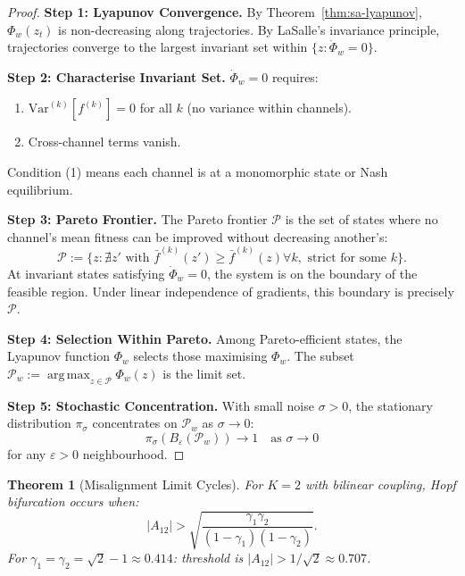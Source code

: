 \documentclass[12pt]{article}
\newtheorem{theorem}{Theorem}[section]
\newcommand{\Var}{\mathrm{Var}}
\DeclareMathOperator*{\argmax}{arg\,max}
\begin{document}
\begin{proof}
\textbf{Step 1: Lyapunov Convergence.}
By Theorem~\ref{thm:sa-lyapunov}, $\Phi_w(z_t)$ is non-decreasing along trajectories. By LaSalle's invariance principle, trajectories converge to the largest invariant set within $\{z : \dot{\Phi}_w = 0\}$.

\textbf{Step 2: Characterise Invariant Set.}
$\dot{\Phi}_w = 0$ requires:
\begin{enumerate}
    \item $\Var^{(k)}[f^{(k)}] = 0$ for all $k$ (no variance within channels).
    \item Cross-channel terms vanish.
\end{enumerate}
Condition (1) means each channel is at a monomorphic state or Nash equilibrium.

\textbf{Step 3: Pareto Frontier.}
The Pareto frontier $\mathcal{P}$ is the set of states where no channel's mean fitness can be improved without decreasing another's:
\[
\mathcal{P} := \{z : \nexists z' \text{ with } \bar{f}^{(k)}(z') \geq \bar{f}^{(k)}(z) \forall k, \text{ strict for some } k\}.
\]
At invariant states satisfying $\dot{\Phi}_w = 0$, the system is on the boundary of the feasible region. Under linear independence of gradients, this boundary is precisely $\mathcal{P}$.

\textbf{Step 4: Selection Within Pareto.}
Among Pareto-efficient states, the Lyapunov function $\Phi_w$ selects those maximising $\Phi_w$. The subset $\mathcal{P}_w := \argmax_{z \in \mathcal{P}} \Phi_w(z)$ is the limit set.

\textbf{Step 5: Stochastic Concentration.}
With small noise $\sigma > 0$, the stationary distribution $\pi_\sigma$ concentrates on $\mathcal{P}_w$ as $\sigma \to 0$:
\[
\pi_\sigma(B_\varepsilon(\mathcal{P}_w)) \to 1 \quad \text{as } \sigma \to 0
\]
for any $\varepsilon > 0$ neighbourhood.
\end{proof}

\begin{theorem}[Misalignment Limit Cycles]
\label{thm:limit-cycles}
For $K = 2$ with bilinear coupling, Hopf bifurcation occurs when:
\[
|A_{12}| > \sqrt{\frac{\gamma_1 \gamma_2}{(1 - \gamma_1)(1 - \gamma_2)}}.
\]
For $\gamma_1 = \gamma_2 = \sqrt{2} - 1 \approx 0.414$: threshold is $|A_{12}| > 1/\sqrt{2} \approx 0.707$.
\end{theorem}
\end{document}
